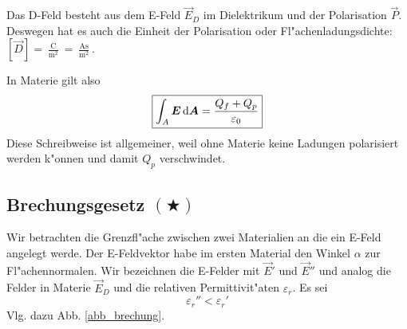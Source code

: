 Das D-Feld besteht aus dem E-Feld $\vec E_D$ im Dielektrikum und der
Polarisation $\vec P$. Deswegen hat es auch die Einheit der
Polarisation oder Fl"achenladungsdichte: $[\vec D] =
 \frac{\operatorname{C}}{\operatorname{m}^2}  =
 \frac{\operatorname{As}}{\operatorname{m}^2}$.

 \begin{Wichtig}
    In Materie gilt also
    \begin{equation}
       \label{eqn_differenz-c54}
       \boxed{ \int_A \boldsymbol{E} \, \mathrm{d} \boldsymbol{A} = \frac{Q_f +
           Q_p}{\varepsilon_0}   }
    \end{equation}
Diese Schreibweise ist allgemeiner, weil ohne Materie keine Ladungen
polarisiert werden k"onnen und damit $Q_p$ verschwindet.
 \end{Wichtig}





\subsection{Brechungsgesetz $(\bigstar)$}
\label{kap_brechungsgesetz}

Wir betrachten die Grenzfl"ache zwischen zwei Materialien an die ein
E-Feld angelegt werde. Der E-Feldvektor habe im ersten Material den
Winkel $\alpha$ zur Fl"achennormalen. Wir bezeichnen die E-Felder mit
$\vec E'$ und $\vec E''$ und analog die Felder in Materie $\vec E_D$
und die relativen Permittivit"aten $\varepsilon_r$. Es sei
\begin{equation}
\label{eqn_differenz-c57}
   \varepsilon_r'' < \varepsilon_r'
\end{equation}
 Vlg. dazu Abb. \ref{abb_brechung}.

